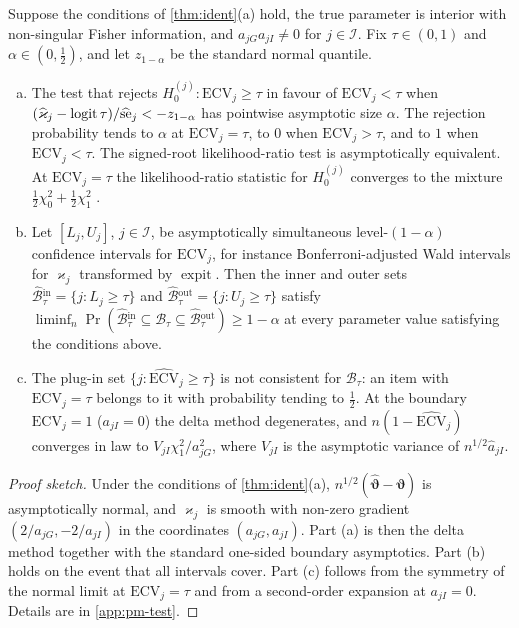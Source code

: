 \begin{proposition}\label{prop:id-boundary-test}
Suppose the conditions of \cref{thm:ident}(a) hold, the true parameter is interior with non-singular Fisher information, and $a_{jG}a_{jI}\neq0$ for $j\in\mathcal I$. Fix $\tau\in(0,1)$ and $\alpha\in(0,\tfrac12)$, and let $z_{1-\alpha}$ be the standard normal quantile.
\begin{enumerate}[(a)]
  \item The test that rejects $H_0^{(j)}:\mathrm{ECV}_j\ge\tau$ in favour of $\mathrm{ECV}_j<\tau$ when $(\widehat\varkappa_j-\operatorname{logit}\tau)/\widehat{\mathrm{se}}_j<-z_{1-\alpha}$ has pointwise asymptotic size $\alpha$. The rejection probability tends to $\alpha$ at $\mathrm{ECV}_j=\tau$, to $0$ when $\mathrm{ECV}_j>\tau$, and to $1$ when $\mathrm{ECV}_j<\tau$. The signed-root likelihood-ratio test is asymptotically equivalent. At $\mathrm{ECV}_j=\tau$ the likelihood-ratio statistic for $H_0^{(j)}$ converges to the mixture $\tfrac12\chi^2_0+\tfrac12\chi^2_1$ \citep{chernoff1954,self1987}.
  \item Let $[L_j,U_j]$, $j\in\mathcal I$, be asymptotically simultaneous level-$(1-\alpha)$ confidence intervals for $\mathrm{ECV}_j$, for instance Bonferroni-adjusted Wald intervals for $\varkappa_j$ transformed by $\operatorname{expit}$. Then the inner and outer sets $\widehat{\mathcal B}{}^{\mathrm{in}}_\tau=\{j:L_j\ge\tau\}$ and $\widehat{\mathcal B}{}^{\mathrm{out}}_\tau=\{j:U_j\ge\tau\}$ satisfy $\liminf_n\Pr(\widehat{\mathcal B}{}^{\mathrm{in}}_\tau\subseteq\mathcal B_\tau\subseteq\widehat{\mathcal B}{}^{\mathrm{out}}_\tau)\ge1-\alpha$ at every parameter value satisfying the conditions above.
  \item The plug-in set $\{j:\widehat{\mathrm{ECV}}_j\ge\tau\}$ is not consistent for $\mathcal B_\tau$: an item with $\mathrm{ECV}_j=\tau$ belongs to it with probability tending to $\tfrac12$. At the boundary $\mathrm{ECV}_j=1$ ($a_{jI}=0$) the delta method degenerates, and $n(1-\widehat{\mathrm{ECV}}_j)$ converges in law to $V_{jI}\chi^2_1/a_{jG}^2$, where $V_{jI}$ is the asymptotic variance of $n^{1/2}\widehat a_{jI}$.
\end{enumerate}
\end{proposition}

\begin{proof}[Proof sketch]
Under the conditions of \cref{thm:ident}(a), $n^{1/2}(\widehat{\bm\vartheta}-\bm\vartheta)$ is asymptotically normal, and $\varkappa_j$ is smooth with non-zero gradient $(2/a_{jG},-2/a_{jI})$ in the coordinates $(a_{jG},a_{jI})$. Part (a) is then the delta method together with the standard one-sided boundary asymptotics. Part (b) holds on the event that all intervals cover. Part (c) follows from the symmetry of the normal limit at $\mathrm{ECV}_j=\tau$ and from a second-order expansion at $a_{jI}=0$. Details are in \cref{app:pm-test}.
\end{proof}

